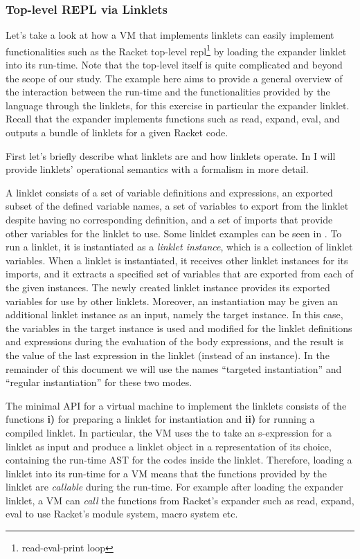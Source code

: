 \subsubsection{Top-level REPL via Linklets}
\label{subsec:toplevel-example}

Let's take a look at how a VM that implements linklets can easily
implement functionalities such as the Racket top-level
repl\footnote{read-eval-print loop} by loading the expander linklet
into its run-time. Note that the top-level itself is quite complicated
and beyond the scope of our study. The example here aims to provide a
general overview of the interaction between the run-time and the
functionalities provided by the language through the linklets, for
this exercise in particular the expander linklet. Recall that the
expander implements functions such as read, expand, eval, and outputs
a bundle of linklets for a given Racket code.

First let's briefly describe what linklets are and how linklets
operate. In  I will provide linklets'
operational semantics with a formalism in more detail.

A linklet consists of a set of variable definitions and expressions,
an exported subset of the defined variable names, a set of variables
to export from the linklet despite having no corresponding definition,
and a set of imports that provide other variables for the linklet to
use. Some linklet examples can be seen in
. To run a linklet, it is
instantiated as a \emph{linklet instance}, which is a collection of
linklet variables. When a linklet is instantiated, it receives other
linklet instances for its imports, and it extracts a specified set of
variables that are exported from each of the given instances. The
newly created linklet instance provides its exported variables for use
by other linklets. Moreover, an instantiation may be given an
additional linklet instance as an input, namely the target
instance. In this case, the variables in the target instance is used
and modified for the linklet definitions and expressions during the
evaluation of the body expressions, and the result is the value of the
last expression in the linklet (instead of an instance). In the
remainder of this document we will use the names ``targeted
instantiation'' and ``regular instantiation'' for these two modes.

The minimal API for a virtual machine to implement the linklets
consists of the functions \textbf{i)}  for
preparing a linklet for instantiation and \textbf{ii)}
 for running a compiled linklet. In
particular, the VM uses the  to take an
s-expression for a linklet as input and produce a linklet object in a
representation of its choice, containing the run-time AST for the
codes inside the linklet. Therefore, loading a linklet into its
run-time for a VM means that the functions provided by the linklet are
\emph{callable} during the run-time. For example after loading the
expander linklet, a VM can \emph{call} the functions from Racket's
expander such as read, expand, eval to use Racket's module system,
macro system etc.


